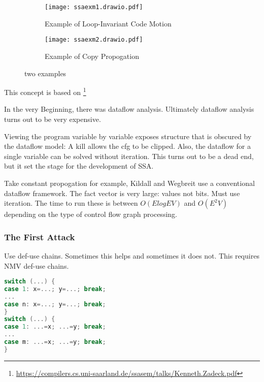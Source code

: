 \begin{figure}[h]
    \centering
    \begin{subfigure}[b]{0.4\textwidth}
        \centering
        \texttt{[image: ssaexm1.drawio.pdf]}
        \caption{Example of Loop-Invariant Code Motion}
        \label{fig:ssaexm1}
    \end{subfigure}
    \hfill
    \begin{subfigure}[b]{0.4\textwidth}
        \centering
        \texttt{[image: ssaexm2.drawio.pdf]}
        \caption{Example of Copy Propogation}
        \label{fig:ssaexm2}
    \end{subfigure}
      
    \caption{two examples}
\end{figure}




This concept is based on \footnote{\url{https://compilers.cs.uni-saarland.de/ssasem/talks/Kenneth.Zadeck.pdf}}


In the very Beginning, there was dataflow analysis.   Ultimately dataflow analysis turns out to be very expensive.

Viewing the program variable by variable exposes structure that is obscured by the dataflow model: 
A kill allows the cfg to be clipped. Also, the dataflow for a single variable can be solved
without iteration. This turns out to be a dead end, but it set the
stage for the development of SSA.


Take constant propogation for example, Kildall and Wegbreit use a conventional
dataflow framework. The fact vector is very large: values not bits. Must use iteration.
The time to run these is between \(O(ElogEV)\) and
\(O(E^2 V)\) depending on the type of control flow
graph processing.



\subsubsection{The First Attack}


Use def-use chains. Sometimes this helps and sometimes it does not. This requires NMV
def-use chains.

\begin{lstlisting}[language=C,frame=single, caption=An ,label = lst:expr2]
switch (...) {
case 1: x=...; y=...; break;
...
case n: x=...; y=...; break;
}
switch (...) {
case 1: ...=x; ...=y; break;
...
case m: ...=x; ...=y; break;
}
\end{lstlisting}


